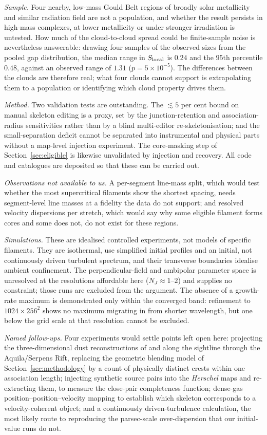 \documentclass[usenatbib,twoside,twocolumn]{mnras}
\begin{document}
\emph{Sample.} Four nearby, low-mass Gould Belt regions of broadly solar metallicity and similar radiation field are not a population, and whether the result persists in high-mass complexes, at lower metallicity or under stronger irradiation is untested. How much of the cloud-to-cloud spread could be finite-sample noise is nevertheless answerable: drawing four samples of the observed sizes from the pooled gap distribution, the median range in $S_{\rm local}$ is $0.24$ and the $95$th percentile $0.48$, against an observed range of $1.31$ ($p=5\times10^{-5}$). The differences between the clouds are therefore real; what four clouds cannot support is extrapolating them to a population or identifying which cloud property drives them.

\emph{Method.} Two validation tests are outstanding. The $\lesssim5$ per cent bound on manual skeleton editing is a proxy, set by the junction-retention and association-radius sensitivities rather than by a blind multi-editor re-skeletonisation; and the small-separation deficit cannot be separated into instrumental and physical parts without a map-level injection experiment. The core-masking step of Section~\ref{sec:eligible} is likewise unvalidated by injection and recovery. All code and catalogues are deposited so that these can be carried out.

\emph{Observations not available to us.} A per-segment line-mass split, which would test whether the most supercritical filaments show the shortest spacing, needs segment-level line masses at a fidelity the data do not support; and resolved velocity dispersions per stretch, which would say why some eligible filament forms cores and some does not, do not exist for these regions.

\emph{Simulations.} These are idealised controlled experiments, not models of specific filaments. They are isothermal, use simplified initial profiles and an initial, not continuously driven turbulent spectrum, and their transverse boundaries idealise ambient confinement. The perpendicular-field and ambipolar parameter space is unresolved at the resolutions affordable here ($N_J\approx1$--$2$) and supplies no constraint; those runs are excluded from the argument. The absence of a growth-rate maximum is demonstrated only within the converged band: refinement to $1024\times256^2$ shows no maximum migrating in from shorter wavelength, but one below the grid scale at that resolution cannot be excluded.

\smallskip\noindent\emph{Named follow-ups.} Four experiments would settle points left open here: projecting the three-dimensional dust reconstructions of \citet{Zucker2020} and \citet{Green2024} along the sightline through the Aquila/Serpens Rift, replacing the geometric blending model of Section~\ref{sec:methodology} by a count of physically distinct crests within one association length; injecting synthetic source pairs into the \textit{Herschel} maps and re-extracting them, to measure the close-pair completeness function; dense-gas position--position--velocity mapping to establish which skeleton corresponds to a velocity-coherent object; and a continuously driven-turbulence calculation, the most likely route to reproducing the parsec-scale over-dispersion that our initial-value runs do not.
\end{document}
